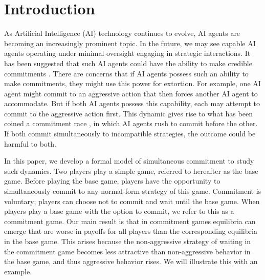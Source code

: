 \documentclass[../paper.tex]{subfiles}
\begin{document}
\section{Introduction}
 
As Artificial Intelligence (AI) technology continues to evolve, AI agents are becoming an increasingly prominent topic. In the future, we may see capable AI agents operating under minimal oversight engaging in strategic interactions. It has been suggested that such AI agents could have the ability to make credible commitments \parencite{hammond_multi-agent_2025}. There are concerns that if AI agents possess such an ability to make commitments, they might use this power for extortion. For example, one AI agent might commit to an aggressive action that then forces another AI agent to accommodate. But if both AI agents possess this capability, each may attempt to commit to the aggressive action first. This dynamic gives rise to what has been coined a commitment race \parencite{kokotajlo_commitment_2019}, in which AI agents rush to commit before the other. If both commit simultaneously to incompatible strategies, the outcome could be harmful to both.
 
In this paper, we develop a formal model of simultaneous commitment to study such dynamics. Two players play a simple game, referred to hereafter as the base game. Before playing the base game, players have the opportunity to simultaneously commit to any normal-form strategy of this game. Commitment is voluntary; players can choose not to commit and wait until the base game. When players play a base game with the option to commit, we refer to this as a commitment game. Our main result is that in commitment games equilibria can emerge that are worse in payoffs for all players than the corresponding equilibria in the base game. This arises because the non-aggressive strategy of waiting in the commitment game becomes less attractive than non-aggressive behavior in the base game, and thus aggressive behavior rises. We will illustrate this with an example.
\end{document}
